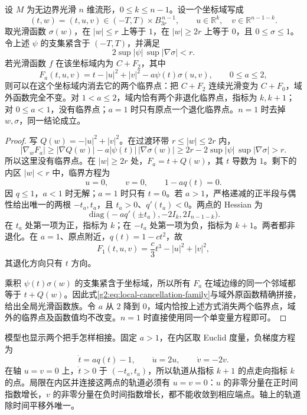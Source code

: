 \begin{proposition}\label{g2:prop:morse-local-cancellation-model}
	设 \(M\) 为无边界光滑 \(n\) 维流形，\(0\le k\le n-1\)。设一个坐标域写成
	\[
		(t,w)=(t,u,v)\in(-T,T)\times B_{3r}^{\,n-1},\qquad
		u\in\mathbb R^k,\quad v\in\mathbb R^{n-1-k}.
	\]
	取光滑函数 \(\sigma(w)\)，在 \(|w|\le r\) 上等于 \(1\)，在 \(|w|\ge2r\) 上等于 \(0\)，且 \(0\le\sigma\le1\)。令上述 \(\psi\) 的支集紧含于 \((-T,T)\)，并满足
	\[
		2\sup|\psi|\,\sup|\nabla\sigma|<r.
	\]
	若光滑函数 \(f\) 在该坐标域内为 \(C+F_2\)，其中
	\begin{equation}\label{g2:eq:local-cancellation-family}
		F_a(t,u,v)=t-|u|^2+|v|^2-a\psi(t)\sigma(u,v),\qquad 0\le a\le2,
	\end{equation}
	则可以在这个坐标域内消去它的两个临界点：把 \(C+F_2\) 连续光滑变为 \(C+F_0\)，域外函数完全不变。对 \(1<a\le2\)，域内恰有两个非退化临界点，指标为 \(k,k+1\)；对 \(0\le a<1\)，没有临界点；\(a=1\) 时只有原点一个退化临界点。\(n=1\) 时去掉 \(w,\sigma\)，同一结论成立。
\end{proposition}
\begin{proof}
	写 \(Q(w)=-|u|^2+|v|^2\)。在过渡环带 \(r\le|w|\le2r\) 内，
	\[
		|\nabla_wF_a|\ge|\nabla Q(w)|-a|\psi(t)|\,|\nabla\sigma(w)|
		\ge2r-2\sup|\psi|\,\sup|\nabla\sigma|>r.
	\]
	所以这里没有临界点。在 \(|w|\ge2r\) 处，\(F_a=t+Q(w)\)，其 \(t\) 导数为 \(1\)。剩下的内区 \(|w|<r\) 中，临界方程为
	\[
		u=0,\qquad v=0,\qquad 1-aq(t)=0.
	\]
	因 \(q\le1\)，\(a<1\) 时无解；\(a=1\) 时只有 \(t=0\)。若 \(a>1\)，严格递减的正半段与偶性给出唯一的两根 \(-t_a,t_a\)，且 \(t_a>0\)、\(q'(t_a)<0\)。两点的 Hessian 为
	\[
		\operatorname{diag}\bigl(-a q'(\pm t_a),-2I_k,2I_{n-1-k}\bigr).
	\]
	在 \(t_a\) 处第一项为正，指标为 \(k\)；在 \(-t_a\) 处第一项为负，指标为 \(k+1\)。两者都非退化。在 \(a=1\)、原点附近，\(q(t)=1-ct^2\)，故
	\[
		F_1(t,u,v)=\frac c3t^3-|u|^2+|v|^2,
	\]
	其退化方向只有 \(t\) 方向。

	乘积 \(\psi(t)\sigma(w)\) 的支集紧含于坐标域，所以所有 \(F_a\) 在域边缘的同一个邻域都等于 \(t+Q(w)\)。因此式\eqref{g2:eq:local-cancellation-family}与域外原函数精确拼接，给出全局光滑函数族。令 \(a\) 从 \(2\) 降到 \(0\)，域内恰按上述方式消失两个临界点，域外的临界点及函数值均不改变。\(n=1\) 时直接使用同一个单变量方程即可。
\end{proof}

模型也显示两个把手怎样相接。固定 \(a>1\)，在内区取 Euclid 度量，负梯度方程为
\[
	\dot t=aq(t)-1,\qquad \dot u=2u,\qquad \dot v=-2v.
\]
在轴 \(u=v=0\) 上，\(\dot t>0\) 于 \((-t_a,t_a)\)，所以轨道从指标 \(k+1\) 的点走向指标 \(k\) 的点。局限在内区并连接这两点的轨道必须有 \(u=v=0\)：\(u\) 的非零分量在正时间指数增长，\(v\) 的非零分量在负时间指数增长，都不能收敛到相应端点。轴上的轨道除时间平移外唯一。

